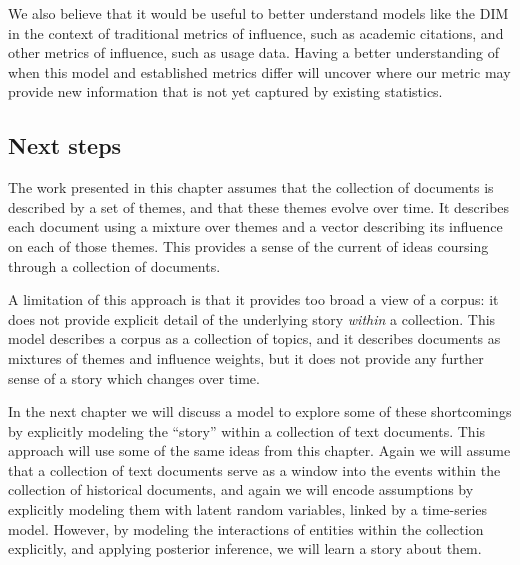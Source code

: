 We also believe that it would be useful to better understand models like
the DIM in the context of traditional metrics of influence, such as
academic citations, and other metrics of influence, such as usage
data.  Having a better understanding of when this model and
established metrics differ will uncover where our metric may provide
new information that is not yet captured by existing statistics.

\subsection{Next steps}
The work presented in this chapter assumes that the collection of
documents is described by a set of themes, and that these themes
evolve over time.  It describes each document using a mixture over
themes and a vector describing its influence on each of those themes.
This provides a sense of the current of ideas coursing through a
collection of documents.

A limitation of this approach is that it provides too broad a view of
a corpus: it does not provide explicit detail of the underlying story
\emph{within} a collection.  This model describes a corpus as a
collection of topics, and it describes documents as mixtures of themes
and influence weights, but it does not provide any further sense of a
story which changes over time.

In the next chapter we will discuss a model to explore some of these
shortcomings by explicitly modeling the ``story'' within a collection
of text documents.  This approach will use some of the same ideas from
this chapter.  Again we will assume that a collection of text
documents serve as a window into the events within the collection of
historical documents, and again we will encode assumptions by
explicitly modeling them with latent random variables, linked by a
time-series model.  However, by modeling the interactions of entities
within the collection explicitly, and applying posterior inference, we
will learn a story about them.

